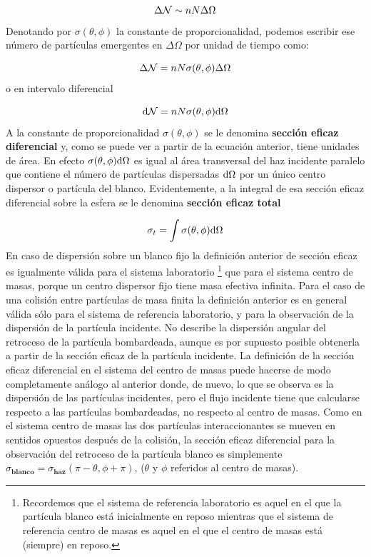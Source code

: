 \begin{equation}
	\Delta \mathcal{N} \sim n N \Delta \Omega
\end{equation}
Denotando por $\sigma (\theta, \phi)$ la constante de proporcionalidad, podemos escribir ese número de partículas emergentes en $\Delta \Omega$ por unidad de tiempo como:

\begin{equation}
	\Delta \mathcal{N} = n N \sigma (\theta,\phi) \Delta \Omega
\end{equation}
o en intervalo diferencial

\begin{equation}
	\mathrm{d} \mathcal{N} = n N \sigma (\theta,\phi) \mathrm{d} \Omega
\end{equation}
A la constante de proporcionalidad $\sigma(\theta,\phi)$ se le denomina \textbf{sección eficaz diferencial} y, como se puede ver a partir de la ecuación anterior, tiene unidades de área. En efecto $\sigma (\theta,\phi)\mathrm{d} \Omega$ es igual al área transversal del haz incidente paralelo que contiene el número de partículas dispersadas $\mathrm{d} \Omega$ por un único centro dispersor  o partícula del blanco. Evidentemente, a la integral de esa sección eficaz diferencial sobre la esfera se le denomina \textbf{sección eficaz total}

\begin{equation}
	\sigma_t = \int \sigma (\theta,\phi) \mathrm{d} \Omega
\end{equation}
En caso de dispersión sobre un blanco fijo la definición anterior de sección eficaz es igualmente válida para el sistema laboratorio \footnote{Recordemos que el sistema de referencia laboratorio es aquel en el que la partícula blanco está inicialmente en reposo mientras que el sistema de referencia centro de masas es aquel en el que el centro de masas está (siempre) en reposo.} que para el sistema centro de masas, porque un centro dispersor fijo tiene masa efectiva infinita. Para el caso de una colisión entre partículas de masa finita la definición anterior es en general válida sólo para el sistema de referencia laboratorio, y para la observación de la dispersión de la partícula incidente. No describe la dispersión angular del retroceso de la partícula bombardeada, aunque es por supuesto posible obtenerla a partir de la sección eficaz de la partícula incidente. La definición de la sección eficaz diferencial en el sistema del centro de masas puede hacerse de modo completamente análogo al anterior donde, de nuevo, lo que se observa es la dispersión de las partículas incidentes, pero el flujo incidente tiene que calcularse respecto a las partículas bombardeadas, no respecto al centro de masas. Como en el sistema centro de masas las dos partículas interaccionantes se mueven en sentidos opuestos después de la colisión, la sección eficaz diferencial para la observación del retroceso de la partícula blanco es simplemente $\sigma_{\textbf{blanco}} = \sigma_{\textbf{haz}} (\pi - \theta, \phi+\pi)$, ($\theta$ y $\phi$ referidos al centro de masas).

